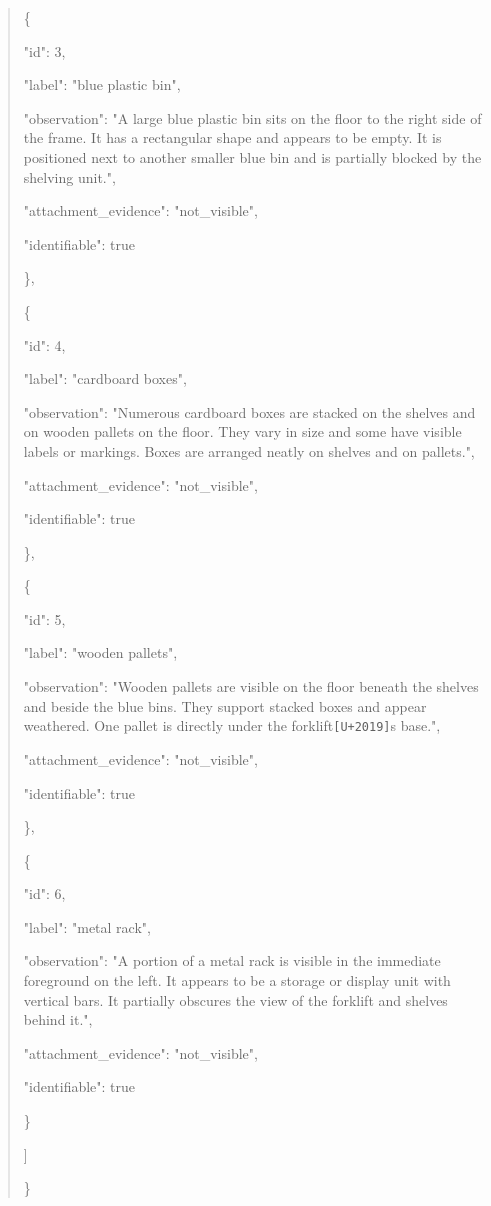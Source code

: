 \documentclass[10pt,a4paper]{article}
\begin{document}
\begin{quote}
    \{\par
      "id":\allowbreak{} 3,\allowbreak{}\par
      "label":\allowbreak{} "blue plastic bin",\allowbreak{}\par
      "observation":\allowbreak{} "A large blue plastic bin sits on the floor to the right side of the frame. It has a rectangular shape and appears to be empty. It is positioned next to another smaller blue bin and is partially blocked by the shelving unit.",\allowbreak{}\par
      "attachment\_evidence":\allowbreak{} "not\_visible",\allowbreak{}\par
      "identifiable":\allowbreak{} true\par
    \},\allowbreak{}\par
    \{\par
      "id":\allowbreak{} 4,\allowbreak{}\par
      "label":\allowbreak{} "cardboard boxes",\allowbreak{}\par
      "observation":\allowbreak{} "Numerous cardboard boxes are stacked on the shelves and on wooden pallets on the floor. They vary in size and some have visible labels or markings. Boxes are arranged neatly on shelves and on pallets.",\allowbreak{}\par
      "attachment\_evidence":\allowbreak{} "not\_visible",\allowbreak{}\par
      "identifiable":\allowbreak{} true\par
    \},\allowbreak{}\par
    \{\par
      "id":\allowbreak{} 5,\allowbreak{}\par
      "label":\allowbreak{} "wooden pallets",\allowbreak{}\par
      "observation":\allowbreak{} "Wooden pallets are visible on the floor beneath the shelves and beside the blue bins. They support stacked boxes and appear weathered. One pallet is directly under the forklift\texttt{[U+2019]}s base.",\allowbreak{}\par
      "attachment\_evidence":\allowbreak{} "not\_visible",\allowbreak{}\par
      "identifiable":\allowbreak{} true\par
    \},\allowbreak{}\par
    \{\par
      "id":\allowbreak{} 6,\allowbreak{}\par
      "label":\allowbreak{} "metal rack",\allowbreak{}\par
      "observation":\allowbreak{} "A portion of a metal rack is visible in the immediate foreground on the left. It appears to be a storage or display unit with vertical bars. It partially obscures the view of the forklift and shelves behind it.",\allowbreak{}\par
      "attachment\_evidence":\allowbreak{} "not\_visible",\allowbreak{}\par
      "identifiable":\allowbreak{} true\par
    \}\par
  ]\par
\}
\end{quote}
\end{document}
